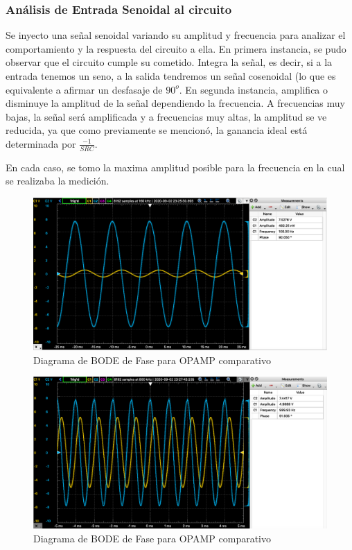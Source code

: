 \subsubsection{Análisis de Entrada Senoidal al circuito}

Se inyecto una señal senoidal variando su amplitud y frecuencia para analizar el comportamiento y la respuesta del circuito a ella.
En primera instancia, se pudo observar que el circuito cumple su cometido. Integra la señal, es decir, si a la entrada tenemos un seno, a la salida tendremos un señal cosenoidal (lo que es equivalente a afirmar un desfasaje de $90^o$.
En segunda instancia, amplifica o disminuye la amplitud de la señal dependiendo la frecuencia. A frecuencias muy bajas, la señal será amplificada y a frecuencias muy altas, la amplitud se ve reducida, ya que como previamente se mencionó, la ganancia ideal
está determinada por $\frac{-1}{SRC}$.

En cada caso, se tomo la maxima amplitud posible para la frecuencia en la cual se realizaba la medición.

\begin{figure}[H]
    \centering 
    \includegraphics [scale=0.4] {../Ejercicio3-CircuitoIntegradoresyDerivadores/Imagenes/senoidal - 100.png} 
    \caption{Diagrama de BODE de Fase para OPAMP comparativo }
    \label{fig:emptyPlotTool}
\end{figure}

\begin{figure}[H]
    \centering 
    \includegraphics [scale=0.4] {../Ejercicio3-CircuitoIntegradoresyDerivadores/Imagenes/senoidal - 1000.png} 
    \caption{Diagrama de BODE de Fase para OPAMP comparativo }
    \label{fig:emptyPlotTool}
\end{figure}

